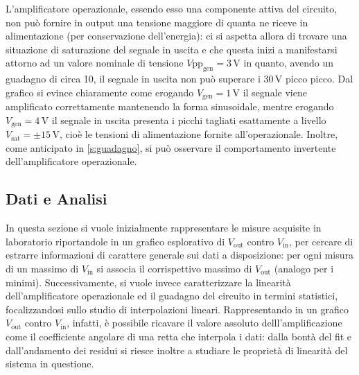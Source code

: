 \documentclass[a4paper,11pt]{article} %
\begin{document}
\noindent L'amplificatore operazionale, essendo esso una componente attiva del circuito, non può fornire in output una
tensione maggiore di quanta ne riceve in alimentazione (per conservazione dell'energia): ci si aspetta allora di trovare
una situazione di saturazione del segnale in uscita e che questa inizi a manifestarsi attorno ad un valore nominale di
tensione $V\text{pp}_{\text{gen}}=3\,\si{\volt}$ in quanto, avendo un guadagno di circa 10, il segnale in uscita non può
superare i $30\,\si{\volt}$ picco picco. Dal grafico si evince chiaramente come erogando $V_{\text{gen}}=1\,\si{\volt}$
il segnale viene amplificato correttamente mantenendo la forma sinusoidale, mentre erogando
$V_{\text{gen}}=4\,\si{\volt}$ il segnale in uscita presenta i picchi tagliati esattamente a livello $V_{\text{sat}}=\pm
15\,\si{\volt}$, cioè le tensioni di alimentazione fornite all'operazionale. Inoltre, come anticipato in
\autoref{s:guadagno}, si può osservare il comportamento invertente dell'amplificatore operazionale.



\subsection{Dati e Analisi}
In questa sezione si vuole inizialmente rappresentare le misure acquisite in laboratorio riportandole in un grafico
esplorativo di $V_{\text{out}}$ contro $V_{\text{in}}$, per cercare di estrarre informazioni di carattere generale sui
dati a disposizione: per ogni misura di un massimo di $V_{\text{in}}$ si associa il corrispettivo massimo di
$V_{\text{out}}$ (analogo per i minimi). Successivamente, si vuole invece caratterizzare la linearità dell'amplificatore
operazionale ed il guadagno del circuito in termini statistici, focalizzandosi sullo studio di interpolazioni lineari.
Rappresentando in un grafico $V_{\text{out}}$ contro $V_{\text{in}}$, infatti, è possibile ricavare il valore assoluto
delll'amplificazione come il coefficiente angolare di una retta che interpola i dati: dalla bontà del fit e
dall'andamento dei residui si riesce inoltre a studiare le proprietà di linearità del sistema in questione. 


\end{document}

